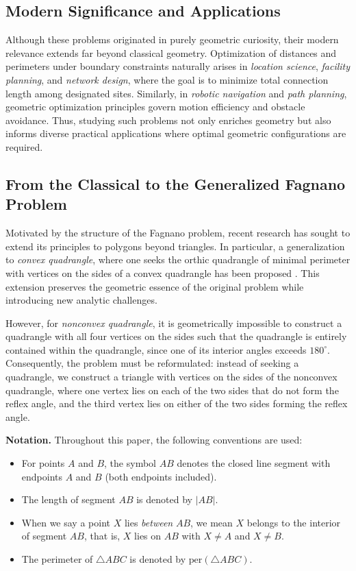 \documentclass[12pt,a4paper]{article}
\theoremstyle{definition}
\theoremstyle{remark}
\begin{document}
\subsection{Modern Significance and Applications}

Although these problems originated in purely geometric curiosity, their modern relevance extends far beyond classical geometry. Optimization of distances and perimeters under boundary constraints naturally arises in \textit{location science}, \textit{facility planning}, and \textit{network design}, where the goal is to minimize total connection length among designated sites. Similarly, in \textit{robotic navigation} and \textit{path planning}, geometric optimization principles govern motion efficiency and obstacle avoidance. Thus, studying such problems not only enriches geometry but also informs diverse practical applications where optimal geometric configurations are required.


\subsection{From the Classical to the Generalized Fagnano Problem}
Motivated by the structure of the Fagnano problem, recent research has sought to extend its 
principles to polygons beyond triangles. In particular, a generalization to \emph{convex 	quadrangle}, where one seeks the orthic quadrangle of minimal perimeter with vertices on 
the sides of a convex quadrangle has been proposed \cite{Mammana2010Orthic}. This extension 
preserves the geometric essence of the original problem while introducing new analytic challenges.

However, for \emph{nonconvex quadrangle}, it is geometrically impossible to construct a 
quadrangle with all four vertices on the sides such that the quadrangle is entirely 
contained within the quadrangle, since one of its interior angles exceeds $180^{\circ}$. 
Consequently, the problem must be reformulated: instead of seeking a quadrangle, we construct a triangle with vertices on the sides of the nonconvex quadrangle, where one vertex lies on each of the two sides that do not form the reflex angle, and the third vertex lies on either of the two sides forming the reflex angle.


\medskip
\textbf{Notation.} Throughout this paper, the following conventions are used:
\begin{itemize}
	\item For points $A$ and $B$, the symbol $AB$ denotes the closed line 
	segment with endpoints $A$ and $B$ (both endpoints included).
	
	\item The length of segment $AB$ is denoted by $|AB|$.
	
	
	\item  When we say a point $X$ lies \emph{between} $AB$, we mean $X$ 	belongs to the interior of segment $AB$, that is, $X$ lies on $AB$ with  	$X \neq A$ and $X \neq B$. 
	
	\item The perimeter of $\triangle ABC$ is denoted by 
	$\mathrm{per}(\triangle ABC)$.
\end{itemize}
\end{document}
